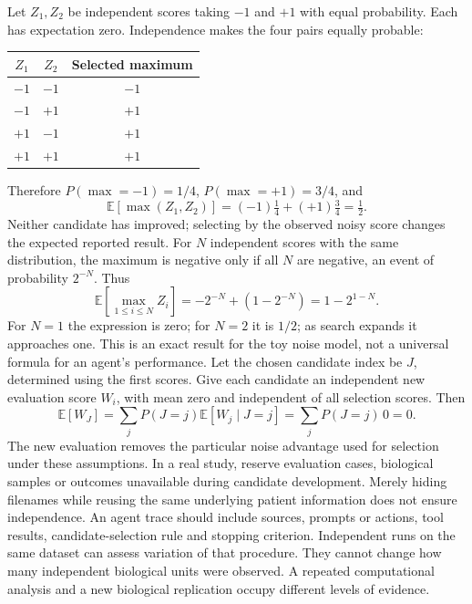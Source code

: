 Let $Z_1,Z_2$ be independent scores taking $-1$ and $+1$ with equal probability. Each has expectation zero. Independence makes the four pairs equally probable:
\begin{center}
\begin{tabular}{ccc}
\toprule
$Z_1$ & $Z_2$ & Selected maximum\\\midrule
$-1$&$-1$&$-1$\\
$-1$&$+1$&$+1$\\
$+1$&$-1$&$+1$\\
$+1$&$+1$&$+1$\\\bottomrule
\end{tabular}
\end{center}
Therefore $P(\max=-1)=1/4$, $P(\max=+1)=3/4$, and
\[
\mathbb E[\max(Z_1,Z_2)]=(-1)\tfrac14+(+1)\tfrac34=\tfrac12.
\]
Neither candidate has improved; selecting by the observed noisy score changes the expected reported result.
For $N$ independent scores with the same distribution, the maximum is negative only if all $N$ are negative, an event of probability $2^{-N}$. Thus
\[
\mathbb E[\max_{1\leq i\leq N}Z_i]
=-2^{-N}+(1-2^{-N})=1-2^{1-N}.
\]
For $N=1$ the expression is zero; for $N=2$ it is $1/2$; as search expands it approaches one. This is an exact result for the toy noise model, not a universal formula for an agent's performance.
Let the chosen candidate index be $J$, determined using the first scores. Give each candidate an independent new evaluation score $W_i$, with mean zero and independent of all selection scores. Then
\[
\mathbb E[W_J]=\sum_j P(J=j)\mathbb E[W_j\mid J=j]
=\sum_jP(J=j)\,0=0.
\]
The new evaluation removes the particular noise advantage used for selection under these assumptions. In a real study, reserve evaluation cases, biological samples or outcomes unavailable during candidate development. Merely hiding filenames while reusing the same underlying patient information does not ensure independence.
An agent trace should include sources, prompts or actions, tool results, candidate-selection rule and stopping criterion. Independent runs on the same dataset can assess variation of that procedure. They cannot change how many independent biological units were observed. A repeated computational analysis and a new biological replication occupy different levels of evidence.


